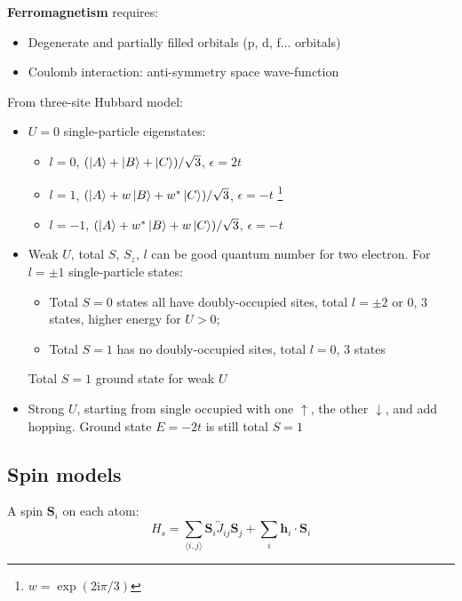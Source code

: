 \documentclass[11pt,letterpaper]{article}
\numberwithin{equation}{section} %
\renewcommand*{\vec}[1]{\bm{#1}}
\newcommand\mi{\mathrm{i}}
\newcommand{\spind}{\ensuremath{\downarrow}}
\newcommand{\spinu}{\ensuremath{\uparrow}}
\begin{document}
\textbf{Ferromagnetism} requires: 
\begin{itemize}
	\item Degenerate and partially filled orbitals (p, d, f... orbitals)
	\item Coulomb interaction: anti-symmetry space wave-function
\end{itemize}
From three-site Hubbard model:
\begin{itemize}
  \item $U=0$ single-particle eigenstates: 
	  \begin{itemize}
		  \item $l=0$, $(\ket A + \ket B + \ket C)/\sqrt 3$, $\epsilon=2t$
		  \item $l=1$, $(\ket A + w\ket B + w^*\ket C)/\sqrt 3$, $\epsilon=-t$
			  \footnote{$w=\exp (2\mi \pi/3)$}
		  \item $l=-1$, $(\ket A + w^*\ket B + w\ket C)/\sqrt 3$, $\epsilon=-t$
	  \end{itemize}
  \item Weak $U$, total $S$, $S_z$, $l$ can be good quantum number for two electron.
	  For $l=\pm1$ single-particle states:  
	  \begin{itemize}
	    \item Total $S=0$ states all have doubly-occupied sites, total
			$l=\pm2$ or $0$, 3 states, higher energy for $U>0$; 
		\item Total $S=1$ has no doubly-occupied sites, total $l=0$, 3 states
	  \end{itemize}
	  Total $S=1$ ground state for weak $U$
  \item Strong $U$, starting from single occupied with one $\spinu$, the
	  other $\spind$, and add hopping. Ground state $E=-2t$ is still total
	  $S=1$
\end{itemize}

\subsection{Spin models}
\label{sub:spin_models}
A spin $\vec S_i$ on each atom: 
\begin{equation}
	H_s = \sum_{\langle i, j\rangle} \vec S_i \overleftrightarrow J_{ij}\vec S_j
	+\sum_i \vec h_i\cdot\vec S_i
\end{equation}
\end{document}
